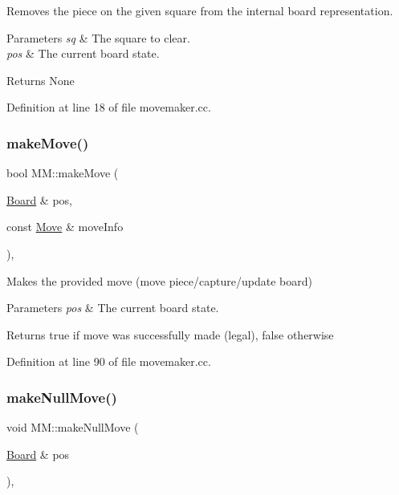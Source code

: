 Removes the piece on the given square from the internal board representation. 


\begin{DoxyParams}{Parameters}
{\em sq} & The square to clear. \\
\hline
{\em pos} & The current board state. \\
\hline
\end{DoxyParams}
\begin{DoxyReturn}{Returns}
None 
\end{DoxyReturn}


Definition at line 18 of file movemaker.\+cc.

\mbox{\label{classMM_ad56f88355a078f3b14b290fe153966b4}} 
\subsubsection{\texorpdfstring{make\+Move()}{makeMove()}}
{\footnotesize\ttfamily bool M\+M\+::make\+Move (\begin{DoxyParamCaption}\item[{\mbox{\hyperlink{classBoard}{Board}} \&}]{pos,  }\item[{const \mbox{\hyperlink{classMove}{Move}} \&}]{move\+Info }\end{DoxyParamCaption})\hspace{0.3cm}{\ttfamily [static]}, {\ttfamily [noexcept]}}



Makes the provided move (move piece/capture/update board) 


\begin{DoxyParams}{Parameters}
{\em pos} & The current board state. \\
\hline
\end{DoxyParams}
\begin{DoxyReturn}{Returns}
true if move was successfully made (legal), false otherwise 
\end{DoxyReturn}


Definition at line 90 of file movemaker.\+cc.

\mbox{\label{classMM_a363e843e6bebaf747bf9482c963ed6b9}} 
\subsubsection{\texorpdfstring{make\+Null\+Move()}{makeNullMove()}}
{\footnotesize\ttfamily void M\+M\+::make\+Null\+Move (\begin{DoxyParamCaption}\item[{\mbox{\hyperlink{classBoard}{Board}} \&}]{pos }\end{DoxyParamCaption})\hspace{0.3cm}{\ttfamily [static]}, {\ttfamily [noexcept]}}



